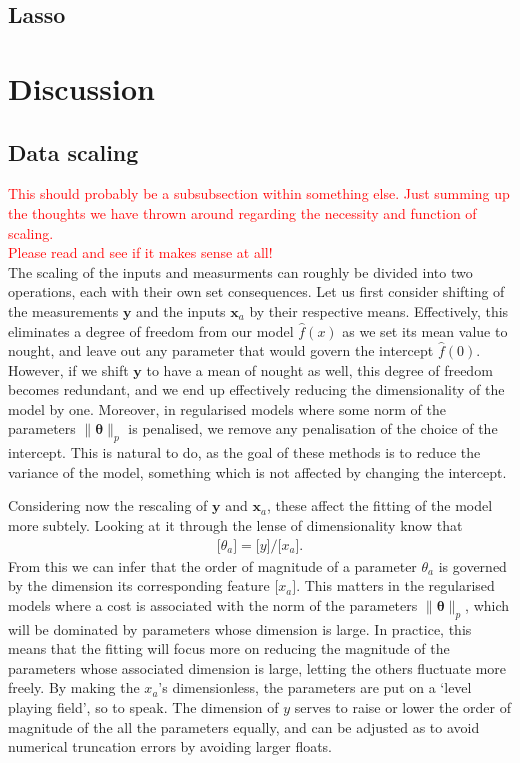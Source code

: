\documentclass[twocolumn,english,notitlepage]{article}
\newcommand{\comment}[1]{\textcolor{red}{#1}\\}
\renewcommand{\vec}[1]{\boldsymbol{#1}}
\renewcommand{\norm}[2][]{\ensuremath{\|#2\|_{#1}}}
\newcommand{\dimof}[1]{\bigl[#1\bigr]}
\begin{document}
    \subsection{Lasso}
\section{Discussion}
    \subsection{Data scaling}
        \comment{This should probably be a subsubsection within something else. Just summing up the thoughts we have thrown around regarding the necessity and function of scaling.}
        \comment{Please read and see if it makes sense at all!}
        The scaling of the inputs and measurments can roughly be divided into two operations, each with their own set consequences. Let us first consider shifting of the measurements $\vec{y}$ and the inputs $\vec{x}_a$ by their respective means. Effectively, this eliminates a degree of freedom from our model $\hat{f}(x)$ as we set its mean value to nought, and leave out any parameter that would govern the intercept $\hat{f}(0)$. However, if we shift $\vec{y}$ to have a mean of nought as well, this degree of freedom becomes redundant, and we end up effectively reducing the dimensionality of the model by one. Moreover, in regularised models where some norm of the parameters $\norm[p]{\vec{\theta}}$ is penalised, we remove any penalisation of the choice of the intercept. This is natural to do, as the goal of these methods is to reduce the variance of the model, something which is not affected by changing the intercept.

        Considering now the rescaling of $\vec{y}$ and $\vec{x}_a$, these affect the fitting of the model more subtely. Looking at it through the lense of dimensionality know that
        \begin{align}
            \dimof{\theta_a} = \dimof{y} / \dimof{x_a}.
        \end{align}
        From this we can infer that the order of magnitude of a parameter $\theta_a$ is governed by the dimension its corresponding feature $\dimof{x_a}$. This matters in the regularised models where a cost is associated with the norm of the parameters $\norm[p]{\vec{\theta}}$, which will be dominated by parameters whose dimension is large. In practice, this means that the fitting will focus more on reducing the magnitude of the parameters whose associated dimension is large, letting the others fluctuate more freely. By making the $x_a$'s dimensionless, the parameters are put on a `level playing field', so to speak. The dimension of $y$ serves to raise or lower the order of magnitude of the all the parameters equally, and can be adjusted as to avoid numerical truncation errors by avoiding larger floats.
\end{document}
